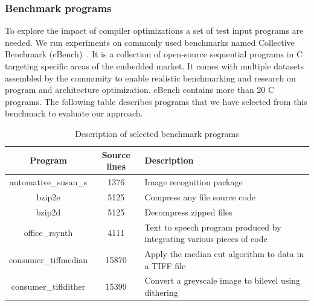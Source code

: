 \subsubsection{Benchmark programs}
To explore the impact of compiler optimizations a set of test input programs are needed. We run experiments on commonly used benchmarks named Collective Benchmark (cBench)~\cite{fursin2009collective}. It is a collection of open-source sequential programs in C targeting specific areas of the embedded market. It comes with multiple datasets assembled by the community to enable realistic benchmarking and research on program and architecture optimization. cBench contains more than 20 C programs. The following table describes programs that we have selected from this benchmark to evaluate our approach.
\begin{table}[h]
	\begin{center}
		\begin{tabular}{|c|c|p{4cm}|}
			\hline
			\textbf{Program} & \textbf{Source lines} & \textbf{Description}\\
			\hline
			automative\_susan\_s & 1376 & Image recognition package\\
			\hline
			bzip2e & 5125 & Compress any file
			source code \\
			\hline
			bzip2d & 5125 & Decompress zipped files \\
			\hline
			office\_rsynth & 4111 & Text to speech program produced by integrating various pieces of code\\
			\hline
			consumer\_tiffmedian& 15870 & Apply the median cut algorithm to data in a TIFF file
			\\
			
			\hline
			 consumer\_tiffdither& 15399 & Convert a greyscale image to bilevel using dithering
			 \\
			\hline
			
		\end{tabular}
		
	\end{center}
	\caption {Description of selected benchmark programs}
\end{table}
